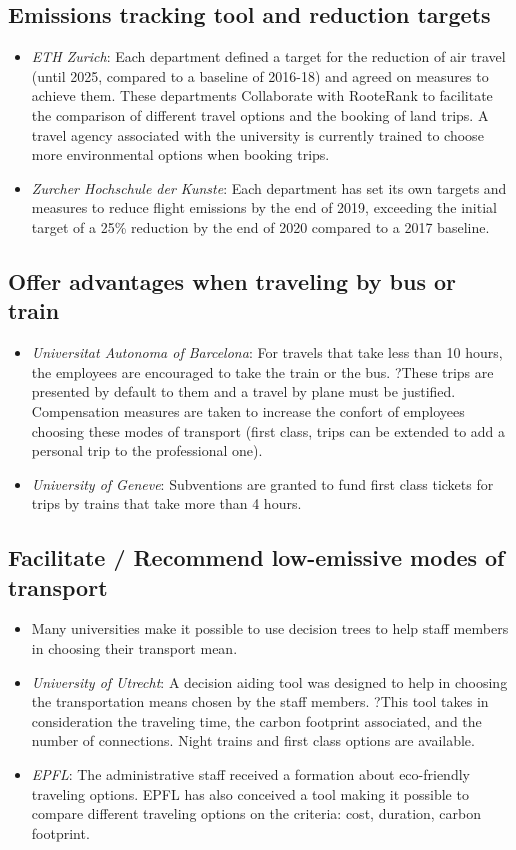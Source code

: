 \documentclass[version=3.21, pagesize, twoside=off, bibliography=totoc, DIV=calc, fontsize=12pt, a4paper, french, english]{scrartcl}
\begin{document}
\subsection{Emissions tracking tool and reduction targets}
\begin{itemize}    
\item \emph{ETH Zurich}: Each department defined a target for the reduction of air travel (until 2025, compared to a baseline of 2016-18) and agreed on measures to achieve them. These departments Collaborate with RooteRank to facilitate the comparison of different travel options and the booking of land trips. A travel agency associated with the university is currently trained to choose more environmental options when booking trips.
\item \emph{Zurcher Hochschule der Kunste}: Each department has set its own targets and measures to reduce flight emissions by the end of 2019, exceeding the initial target of a 25\% reduction by the end of 2020 compared to a 2017 baseline.
\end{itemize}

\subsection{Offer advantages when traveling by bus or train}
\begin{itemize}
\item \emph{Universitat Autonoma of Barcelona}: For travels that take less than 10 hours, the employees are encouraged to take the train or the bus. ?These trips are presented by default to them and a travel by plane must be justified. Compensation measures are taken to increase the confort of employees choosing these modes of transport (first class, trips can be extended to add a personal trip to the professional one).
\item \emph{University of Geneve}: Subventions are granted to fund first class tickets for trips by trains that take more than 4 hours. 
\end{itemize}

\subsection{Facilitate / Recommend low-emissive modes of transport}
\begin{itemize}
\item Many universities make it possible to use decision trees to help staff members in choosing their transport mean. 
\item \emph{University of Utrecht}: A decision aiding tool was designed to help in choosing the transportation means chosen by the staff members. ?This tool takes in consideration the traveling time, the carbon footprint associated, and the number of  connections. Night trains and first class options are available. 
\item \emph{EPFL}: The administrative staff received a formation about eco-friendly traveling options. EPFL has also conceived a tool making it possible to compare different traveling options on the criteria: cost, duration, carbon footprint.
\end{itemize}
\end{document}

